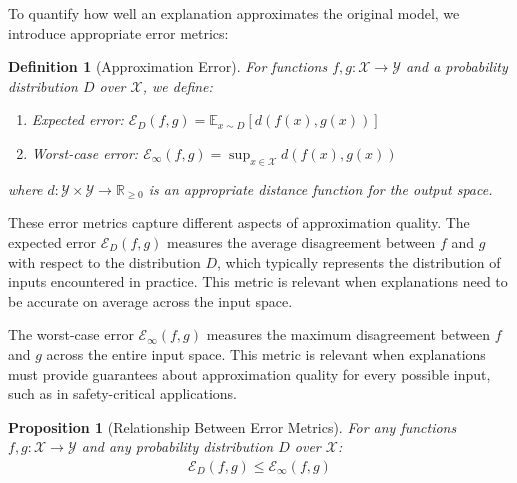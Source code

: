 \documentclass[11pt,letter,leqno]{article}
\newtheorem{proposition}[theorem]{Proposition}
\newtheorem{definition}[theorem]{Definition}
\begin{document}
To quantify how well an explanation approximates the original model, we introduce appropriate error metrics:

\begin{definition}[Approximation Error]
\label{def:approximation-error}
For functions $f, g: \mathcal{X} \rightarrow \mathcal{Y}$ and a probability distribution $D$ over $\mathcal{X}$, we define:
\begin{enumerate}
\item Expected error: $\mathcal{E}_D(f, g) = \mathbb{E}_{x \sim D}[d(f(x), g(x))]$
\item Worst-case error: $\mathcal{E}_{\infty}(f, g) = \sup_{x \in \mathcal{X}} d(f(x), g(x))$
\end{enumerate}
where $d: \mathcal{Y} \times \mathcal{Y} \rightarrow \mathbb{R}_{\geq 0}$ is an appropriate distance function for the output space.
\end{definition}

These error metrics capture different aspects of approximation quality.  The expected error $\mathcal{E}_D(f, g)$ measures the average disagreement between $f$ and $g$ with respect to the distribution $D$, which typically represents the distribution of inputs encountered in practice.  This metric is relevant when explanations need to be accurate on average across the input space.

The worst-case error $\mathcal{E}_{\infty}(f, g)$ measures the maximum disagreement between $f$ and $g$ across the entire input space.  This metric is relevant when explanations must provide guarantees about approximation quality for every possible input, such as in safety-critical applications.

\begin{proposition}[Relationship Between Error Metrics]
\label{thm:error-relationship}
For any functions $f, g: \mathcal{X} \rightarrow \mathcal{Y}$ and any probability distribution $D$ over $\mathcal{X}$:
\begin{align}
\mathcal{E}_D(f, g) \leq \mathcal{E}_{\infty}(f, g)
\end{align}
\end{proposition}
\end{document}
